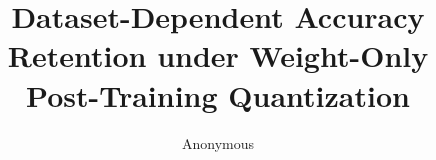 \documentclass[10pt,twocolumn,letterpaper]{article}
\title{Dataset-Dependent Accuracy Retention under Weight-Only\\Post-Training Quantization}
\author{Anonymous}
\begin{document}
\maketitle






{
    \small
    
    
}
\clearpage
\appendix

\end{document}
